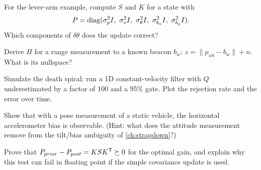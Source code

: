 \begin{exercises}
  \item For the lever-arm example, compute $S$ and $K$ for a state with
        \[ P = \diag(\sigma_p^2I,\ \sigma_v^2I,\ \sigma_\theta^2I,\ \sigma_{b_a}^2I,\ \sigma_{b_g}^2I). \]
        Which components of $\delta\theta$ does the update correct?
  \item Derive $H$ for a range measurement to a known beacon $b_w$: $z = \|p_{wb} - b_w\| + n$. What is its nullspace?
  \item Simulate the death spiral: run a 1D constant-velocity filter with $Q$ underestimated by a factor of 100 and a
        95\% gate. Plot the rejection rate and the error over time.
  \item Show that with a pose measurement of a static vehicle, the horizontal accelerometer bias is observable.
        (Hint: what does the attitude measurement remove from the tilt/bias ambiguity of \cref{ch:strapdown}?)
  \item Prove that $P_{prior} - P_{post} = KSK^{\mathsf{T}} \succeq 0$ for the optimal gain, and explain why this test can fail in floating
        point if the simple covariance update is used.
\end{exercises}

